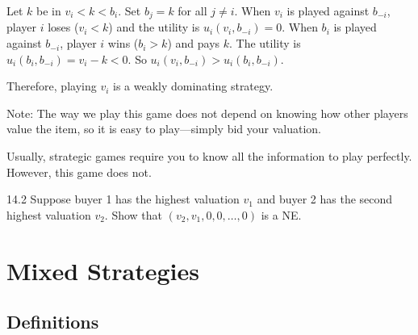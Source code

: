 \documentclass[12pt,letterpaper]{report}
\begin{document}
\begin{thmproof}
\begin{enumcase}
      Let $k$ be in $v_i < k < b_i$.
      Set $b_j = k$ for all $j \neq i$.
      When $v_i$ is played against $b_{-i}$, player $i$ loses ($v_i < k$) and the utility is
      $u_i(v_i, b_{-i}) = 0$.
      When $b_i$ is played against $b_{-i}$, player $i$ wins ($b_i > k$) and pays $k$.
      The utility is $u_i(b_i, b_{-i}) = v_i - k < 0$.
      So $u_i(v_i, b_{-i}) > u_i(b_i, b_{-i})$.
  \end{enumcase}
  Therefore, playing $v_i$ is a weakly dominating strategy.
\end{thmproof}

Note: The way we play this game does not depend on knowing how other players value the item, so it
is easy to play---simply bid your valuation.

Usually, strategic games require you to know all the information to play perfectly.
However, this game does not.

\begin{exer}{}{14.2}
  Suppose buyer 1 has the highest valuation $v_1$ and buyer 2 has the second highest valuation
  $v_2$.
  Show that $(v_2, v_1, 0, 0, \ldots, 0)$ is a NE.
\end{exer}

\section{Mixed Strategies}

\subsection{Definitions}
\end{document}
